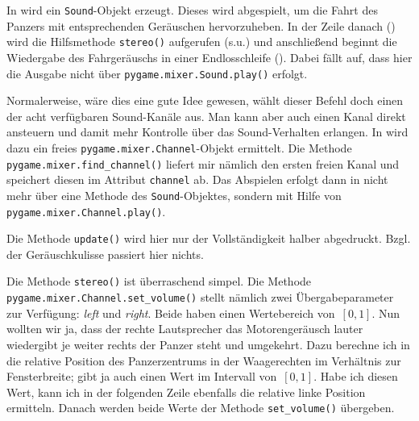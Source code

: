 
In  wird ein \texttt{Sound}-Objekt erzeugt. Dieses wird abgespielt, um die Fahrt des Panzers mit entsprechenden Geräuschen hervorzuheben. In der Zeile danach () wird die Hilfsmethode \texttt{stereo()} aufgerufen (s.u.) und anschließend beginnt die Wiedergabe des Fahrgeräuschs in einer Endlosschleife (). Dabei fällt auf, dass hier die Ausgabe nicht über \texttt{pygame.mixer.Sound.play()} erfolgt. 

Normalerweise, wäre dies eine gute Idee gewesen, wählt dieser Befehl doch einen der acht verfügbaren Sound-Kanäle aus. Man kann aber auch einen Kanal direkt ansteuern und damit mehr Kontrolle über das Sound-Verhalten erlangen. In  wird dazu ein freies  \texttt{pygame.mixer.Channel}-Objekt ermittelt. Die Methode \texttt{pygame.mixer.find\-\_chan\-nel()}  liefert mir nämlich den ersten freien Kanal und speichert diesen im Attribut \texttt{channel} ab. Das Abspielen erfolgt dann in  nicht mehr über eine Methode des \texttt{Sound}-Objektes, sondern mit Hilfe von \texttt{pygame.mixer.Channel.play()}. 


Die Methode \texttt{update()} wird hier nur der Vollständigkeit halber abgedruckt. Bzgl. der Geräuschkulisse passiert hier nichts. 


Die Methode \texttt{stereo()} ist überraschend simpel. Die Methode \texttt{pygame.mixer.Channel\-.set\-\_vol\-ume()} stellt nämlich zwei Übergabeparameter zur Verfügung: \emph{left} und \emph{right}. Beide haben einen Wertebereich von~$[0, 1]$. Nun wollten wir ja, dass der rechte Lautsprecher das Motorengeräusch lauter wiedergibt je weiter rechts der Panzer steht und umgekehrt. Dazu berechne ich in  die relative Position des Panzerzentrums in der Waagerechten im Verhältnis zur Fensterbreite; gibt ja auch einen Wert im Intervall von~$[0, 1]$. Habe ich diesen Wert, kann ich in der folgenden Zeile ebenfalls die relative linke Position ermitteln. Danach werden beide Werte der Methode \texttt{set\_volume()} übergeben. 

